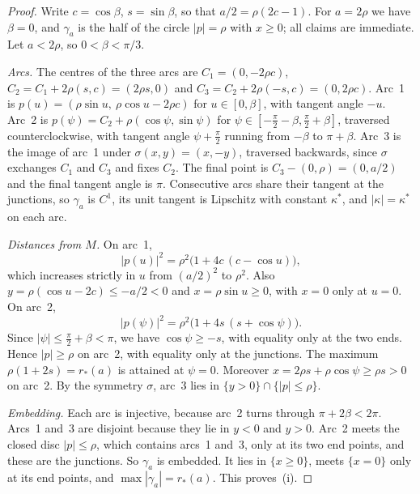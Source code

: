 \documentclass[11pt,reqno]{amsart}
\theoremstyle{definition}
\numberwithin{equation}{section}
\begin{document}
\begin{proof}
Write $c=\cos\beta$, $s=\sin\beta$, so that $a/2=\rho(2c-1)$. For $a=2\rho$ we have $\beta=0$, and $\gamma_a$ is the half of the circle $|p|=\rho$ with $x\ge0$; all claims are immediate. Let $a<2\rho$, so $0<\beta<\pi/3$.

\emph{Arcs.} The centres of the three arcs are $C_1=(0,-2\rho c)$, $C_2=C_1+2\rho(s,c)=(2\rho s,0)$ and $C_3=C_2+2\rho(-s,c)=(0,2\rho c)$. Arc~1 is $p(u)=(\rho\sin u,\ \rho\cos u-2\rho c)$ for $u\in[0,\beta]$, with tangent angle $-u$. Arc~2 is $p(\psi)=C_2+\rho(\cos\psi,\sin\psi)$ for $\psi\in[-\tfrac\pi2-\beta,\tfrac\pi2+\beta]$, traversed counterclockwise, with tangent angle $\psi+\tfrac\pi2$ running from $-\beta$ to $\pi+\beta$. Arc~3 is the image of arc~1 under $\sigma(x,y)=(x,-y)$, traversed backwards, since $\sigma$ exchanges $C_1$ and $C_3$ and fixes $C_2$. The final point is $C_3-(0,\rho)=(0,a/2)$ and the final tangent angle is $\pi$. Consecutive arcs share their tangent at the junctions, so $\gamma_a$ is $C^1$, its unit tangent is Lipschitz with constant $\kappa^*$, and $|\kappa|=\kappa^*$ on each arc.

\emph{Distances from $M$.} On arc~1,
\[
|p(u)|^2=\rho^2\bigl(1+4c\,(c-\cos u)\bigr),
\]
which increases strictly in $u$ from $(a/2)^2$ to $\rho^2$. Also $y=\rho(\cos u-2c)\le-a/2<0$ and $x=\rho\sin u\ge0$, with $x=0$ only at $u=0$. On arc~2,
\[
|p(\psi)|^2=\rho^2\bigl(1+4s\,(s+\cos\psi)\bigr).
\]
Since $|\psi|\le\tfrac\pi2+\beta<\pi$, we have $\cos\psi\ge-s$, with equality only at the two ends. Hence $|p|\ge\rho$ on arc~2, with equality only at the junctions. The maximum $\rho(1+2s)=r_*(a)$ is attained at $\psi=0$. Moreover $x=2\rho s+\rho\cos\psi\ge\rho s>0$ on arc~2. By the symmetry $\sigma$, arc~3 lies in $\{y>0\}\cap\{|p|\le\rho\}$.

\emph{Embedding.} Each arc is injective, because arc~2 turns through $\pi+2\beta<2\pi$. Arcs~1 and~3 are disjoint because they lie in $y<0$ and $y>0$. Arc~2 meets the closed disc $|p|\le\rho$, which contains arcs~1 and~3, only at its two end points, and these are the junctions. So $\gamma_a$ is embedded. It lies in $\{x\ge0\}$, meets $\{x=0\}$ only at its end points, and $\max|\gamma_a|=r_*(a)$. This proves~(i).


\end{proof}
\end{document}
